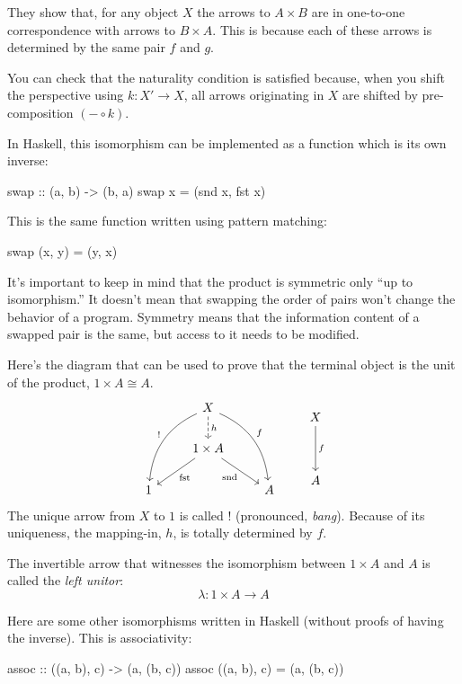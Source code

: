 \documentclass[DaoFP]{subfiles}
\begin{document}
They show that, for any object $X$ the arrows to $A \times B$ are in one-to-one correspondence with arrows to $B \times A$. This is because each of these arrows is determined by the same pair $f$ and $g$. 

You can check that the naturality condition is satisfied because, when you shift the perspective using $k \colon X' \to X$, all arrows originating in $X$ are shifted by pre-composition $(- \circ k)$.

In Haskell, this isomorphism can be implemented as a function which is its own inverse:
\begin{haskell}
swap :: (a, b) -> (b, a)
swap x = (snd x, fst x)
\end{haskell}
This is the same function written using pattern matching:
\begin{haskell}
swap (x, y) = (y, x)
\end{haskell}

It's important to keep in mind that the product is symmetric only ``up to isomorphism.'' It doesn't mean that swapping the order of pairs won't change the behavior of a program. Symmetry means that the information content of a swapped pair is the same, but access to it needs to be modified.

Here's the diagram that can be used to prove that the terminal object is the unit of the product, $1 \times A \cong A$.
\[
 \begin{tikzcd}
 &X
 \arrow[d, dashed, "h"]
 \arrow[ddl, bend right, "!"']
 \arrow[ddr, bend left, "f"]
 \\
 & 1 \times A
  \arrow[dl,  "\text{fst}"]
 \arrow[dr,   "\text{snd}"']
 \\
1 && A
 \end{tikzcd}
 \qquad
 \begin{tikzcd}
 X
 \arrow[dd, "f"]
\\
\\
A
  \end{tikzcd}
\]
The unique arrow from $X$ to $1$ is called $!$ (pronounced, \emph{bang}). Because of its uniqueness, the mapping-in, $h$, is totally determined by $f$.

The invertible arrow that witnesses the isomorphism between $1 \times A$ and $A$ is called the \emph{left unitor}:
\[ \lambda \colon 1 \times A \to A \]

Here are some other isomorphisms written in Haskell (without proofs of having the inverse). This is associativity:
\begin{haskell}
assoc :: ((a, b), c) -> (a, (b, c))
assoc ((a, b), c) = (a, (b, c))
\end{haskell}
\end{document}
